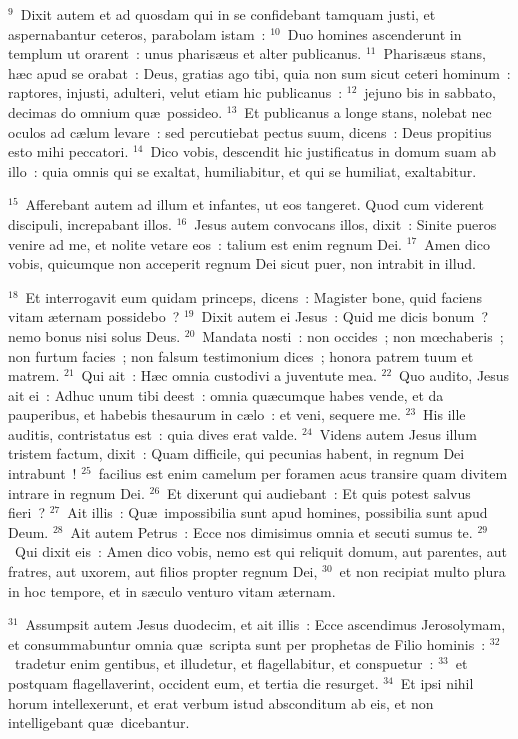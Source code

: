 ${}^{9}$~Dixit autem et ad quosdam qui in se confidebant tamquam justi, et aspernabantur ceteros, parabolam istam~:
${}^{10}$~Duo homines ascenderunt in templum ut orarent~: unus pharis\ae us et alter publicanus.
${}^{11}$~Pharis\ae us stans, h\ae c apud se orabat~: Deus, gratias ago tibi, quia non sum sicut ceteri hominum~: raptores, injusti, adulteri, velut etiam hic publicanus~:
${}^{12}$~jejuno bis in sabbato, decimas do omnium qu\ae\ possideo.
${}^{13}$~Et publicanus a longe stans, nolebat nec oculos ad c\ae lum levare~: sed percutiebat pectus suum, dicens~: Deus propitius esto mihi peccatori.
${}^{14}$~Dico vobis, descendit hic justificatus in domum suam ab illo~: quia omnis qui se exaltat, humiliabitur, et qui se humiliat, exaltabitur.


${}^{15}$~Afferebant autem ad illum et infantes, ut eos tangeret. Quod cum viderent discipuli, increpabant illos.
${}^{16}$~Jesus autem convocans illos, dixit~: Sinite pueros venire ad me, et nolite vetare eos~: talium est enim regnum Dei.
${}^{17}$~Amen dico vobis, quicumque non acceperit regnum Dei sicut puer, non intrabit in illud.


${}^{18}$~Et interrogavit eum quidam princeps, dicens~: Magister bone, quid faciens vitam \ae ternam possidebo~?
${}^{19}$~Dixit autem ei Jesus~: Quid me dicis bonum~? nemo bonus nisi solus Deus.
${}^{20}$~Mandata nosti~: non occides~; non mœchaberis~; non furtum facies~; non falsum testimonium dices~; honora patrem tuum et matrem.
${}^{21}$~Qui ait~: H\ae c omnia custodivi a juventute mea.
${}^{22}$~Quo audito, Jesus ait ei~: Adhuc unum tibi deest~: omnia qu\ae cumque habes vende, et da pauperibus, et habebis thesaurum in c\ae lo~: et veni, sequere me.
${}^{23}$~His ille auditis, contristatus est~: quia dives erat valde.
${}^{24}$~Videns autem Jesus illum tristem factum, dixit~: Quam difficile, qui pecunias habent, in regnum Dei intrabunt~!
${}^{25}$~facilius est enim camelum per foramen acus transire quam divitem intrare in regnum Dei.
${}^{26}$~Et dixerunt qui audiebant~: Et quis potest salvus fieri~?
${}^{27}$~Ait illis~: Qu\ae\ impossibilia sunt apud homines, possibilia sunt apud Deum.
${}^{28}$~Ait autem Petrus~: Ecce nos dimisimus omnia et secuti sumus te.
${}^{29}$~Qui dixit eis~: Amen dico vobis, nemo est qui reliquit domum, aut parentes, aut fratres, aut uxorem, aut filios propter regnum Dei,
${}^{30}$~et non recipiat multo plura in hoc tempore, et in s\ae culo venturo vitam \ae ternam.


${}^{31}$~Assumpsit autem Jesus duodecim, et ait illis~: Ecce ascendimus Jerosolymam, et consummabuntur omnia qu\ae\ scripta sunt per prophetas de Filio hominis~:
${}^{32}$~tradetur enim gentibus, et illudetur, et flagellabitur, et conspuetur~:
${}^{33}$~et postquam flagellaverint, occident eum, et tertia die resurget.
${}^{34}$~Et ipsi nihil horum intellexerunt, et erat verbum istud absconditum ab eis, et non intelligebant qu\ae\ dicebantur.


